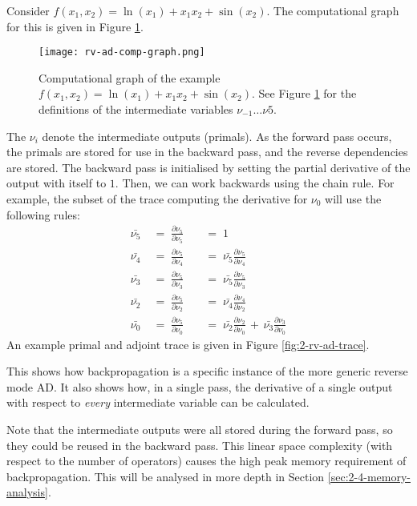 Consider \(f(x_1, x_2) = \ln(x_1) + x_1x_2 + \sin(x_2)\).
The computational graph for this is given in Figure \ref{fig:2-rv-ad-comp-graph}.
\begin{figure}[h]
    \centering
    \texttt{[image: rv-ad-comp-graph.png]}
    \caption{Computational graph of the example \(f(x_1, x_2) = \ln(x_1) + x_1x_2 + \sin(x_2)\). See Figure \ref{fig:2-rv-ad-comp-graph} for the definitions of the intermediate variables \(\nu_{-1}\ldots\nu{5}\). \cite[Figure~3]{Baydin2015}}
    \label{fig:2-rv-ad-comp-graph}
\end{figure}
The \(\nu_i\) denote the intermediate outputs (primals).
As the forward pass occurs, the primals are stored for use in the backward pass, and the reverse dependencies are stored.
The backward pass is initialised by setting the partial derivative of the output with itself to \(1\).
Then, we can work backwards using the chain rule.
For example, the subset of the trace computing the derivative for \(\nu_0\) will use the following rules:
\begin{align*}
    \bar{\nu_5} \;&=\; \frac{\partial \nu_5}{\partial \nu_5} \;&&=\; 1 \\[0.5em]
    \bar{\nu_4} \;&=\; \frac{\partial \nu_5}{\partial \nu_4} \;&&=\; \bar{\nu_5}\frac{\partial \nu_5}{\partial \nu_4} \\[0.5em]
    \bar{\nu_3} \;&=\; \frac{\partial \nu_5}{\partial \nu_3} \;&&=\; \bar{\nu_5}\frac{\partial \nu_5}{\partial \nu_3} \\[0.5em]
    \bar{\nu_2} \;&=\; \frac{\partial \nu_5}{\partial \nu_2} \;&&=\; \bar{\nu_4}\frac{\partial \nu_4}{\partial \nu_2} \\[0.5em]
    \bar{\nu_0} \;&=\; \frac{\partial \nu_5}{\partial \nu_0} \;&&=\; \bar{\nu_2}\frac{\partial \nu_2}{\partial \nu_0} \,+\, \bar{\nu_3}\frac{\partial \nu_3}{\partial \nu_0}
\end{align*}
An example primal and adjoint trace is given in Figure \ref{fig:2-rv-ad-trace}.

This shows how backpropagation is a specific instance of the more generic reverse mode AD.
It also shows how, in a single pass, the derivative of a single output with respect to \textit{every} intermediate variable can be calculated.

Note that the intermediate outputs were all stored during the forward pass, so they could be reused in the backward pass.
This linear space complexity (with respect to the number of operators) causes the high peak memory requirement of backpropagation.
This will be analysed in more depth in Section \ref{sec:2-4-memory-analysis}.

